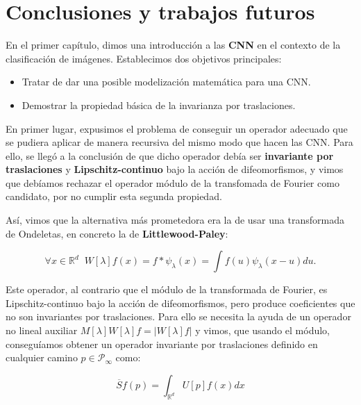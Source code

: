 

\chapter{Conclusiones y trabajos futuros}

\noindent En el primer capítulo, dimos una introducción a las \textbf{CNN} en el contexto de la clasificación de imágenes. Establecimos dos objetivos principales:

\begin{itemize}
  \item Tratar de dar una posible modelización matemática para una CNN.
  \item Demostrar la propiedad básica de la invarianza por traslaciones. 
\end{itemize}


\medskip

\noindent En primer lugar, expusimos el problema de conseguir un operador adecuado que se pudiera aplicar de manera recursiva del mismo modo que hacen las CNN. Para ello, se llegó a la conclusión de que dicho operador debía ser \textbf{invariante por traslaciones} y \textbf{Lipschitz-continuo} bajo la acción de difeomorfismos, y vimos que debíamos rechazar el operador módulo de la transfomada de Fourier como candidato, por no cumplir esta segunda propiedad. 

\medskip

\noindent Así, vimos que la alternativa más prometedora era la de usar una transformada de Ondeletas, en concreto la de \textbf{Littlewood-Paley}:

\begin{equation}
  \forall x \in  \mathbb{R}^d \;\; W[\lambda]f(x)= f \ast \psi_\lambda(x)=\int f(u)\psi_\lambda(x-u) du .
\end{equation}

\noindent Este operador, al contrario que el módulo de la transformada de Fourier, es Lipschitz-continuo bajo la acción de difeomorfismos, pero produce coeficientes que no son invariantes por traslaciones. Para ello se necesita la ayuda de un operador no lineal auxiliar $M[\lambda]W[\lambda]f=|W[\lambda]f|$ y vimos, que usando el módulo, conseguíamos obtener un operador invariante por traslaciones definido en cualquier camino $p \in \mathcal{P}_\infty$ como:

\begin{equation}
  \overline{S}f(p)=\int_{\mathbb{R}^d}U[p]f(x)dx 
\end{equation} 


